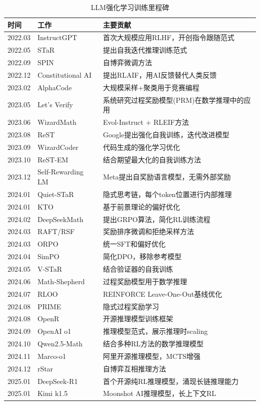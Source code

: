 \documentclass[12pt,a4paper]{article}
\begin{document}
\begin{table}[H]
\centering
\caption{LLM强化学习训练里程碑}
\begin{tabular}{llp{8cm}}
\toprule
\textbf{时间} & \textbf{工作} & \textbf{主要贡献} \\
\midrule
2022.03 & InstructGPT & 首次大规模应用RLHF，开创指令跟随范式 \\
2022.05 & STaR & 提出自我迭代推理训练范式 \\
2022.09 & SPIN & 自博弈微调方法 \\
2022.12 & Constitutional AI & 提出RLAIF，用AI反馈替代人类反馈 \\
2023.02 & AlphaCode & 大规模采样+聚类用于竞赛编程 \\
2023.05 & Let's Verify & 系统研究过程奖励模型(PRM)在数学推理中的应用 \\
2023.06 & WizardMath & Evol-Instruct + RLEIF方法 \\
2023.08 & ReST & Google提出强化自我训练，迭代改进模型 \\
2023.09 & WizardCoder & 代码生成的强化学习优化 \\
2023.10 & ReST-EM & 结合期望最大化的自我训练方法 \\
2023.12 & Self-Rewarding LM & Meta提出自奖励语言模型，无需外部奖励 \\
2024.01 & Quiet-STaR & 隐式思考链，每个token位置进行内部推理 \\
2024.01 & KTO & 基于前景理论的偏好优化 \\
2024.02 & DeepSeekMath & 提出GRPO算法，简化RL训练流程 \\
2024.03 & RAFT/RSF & 奖励排序微调和拒绝采样方法 \\
2024.03 & ORPO & 统一SFT和偏好优化 \\
2024.04 & SimPO & 简化DPO，移除参考模型 \\
2024.05 & V-STaR & 结合验证器的自我训练 \\
2024.06 & Math-Shepherd & 过程奖励模型用于数学推理 \\
2024.07 & RLOO & REINFORCE Leave-One-Out基线优化 \\
2024.08 & PRIME & 隐式过程奖励学习 \\
2024.08 & OpenR & 开源推理模型训练框架 \\
2024.09 & OpenAI o1 & 推理模型范式，展示推理时scaling \\
2024.10 & Qwen2.5-Math & 结合多种RL方法的数学推理模型 \\
2024.11 & Marco-o1 & 阿里开源推理模型，MCTS增强 \\
2024.12 & rStar & 自博弈互相推理方法 \\
2025.01 & DeepSeek-R1 & 首个开源纯RL推理模型，涌现长链推理能力 \\
2025.01 & Kimi k1.5 & Moonshot AI推理模型，长上下文RL \\
\bottomrule
\end{tabular}
\end{table}
\end{document}
